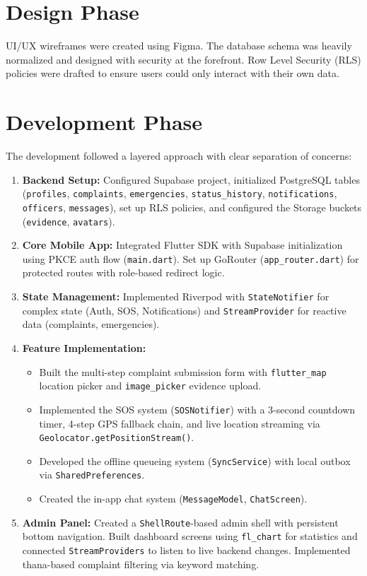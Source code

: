 \documentclass[11pt, a4paper]{report}
\begin{document}
\section{Design Phase}
UI/UX wireframes were created using Figma. The database schema was heavily normalized and designed with security at the forefront. Row Level Security (RLS) policies were drafted to ensure users could only interact with their own data.

\section{Development Phase}
The development followed a layered approach with clear separation of concerns:
\begin{enumerate}
    \item \textbf{Backend Setup:} Configured Supabase project, initialized PostgreSQL tables (\texttt{profiles}, \texttt{complaints}, \texttt{emergencies}, \texttt{status\_history}, \texttt{notifications}, \texttt{officers}, \texttt{messages}), set up RLS policies, and configured the Storage buckets (\texttt{evidence}, \texttt{avatars}).
    \item \textbf{Core Mobile App:} Integrated Flutter SDK with Supabase initialization using PKCE auth flow (\texttt{main.dart}). Set up GoRouter (\texttt{app\_router.dart}) for protected routes with role-based redirect logic.
    \item \textbf{State Management:} Implemented Riverpod with \texttt{StateNotifier} for complex state (Auth, SOS, Notifications) and \texttt{StreamProvider} for reactive data (complaints, emergencies).
    \item \textbf{Feature Implementation:}
    \begin{itemize}
        \item Built the multi-step complaint submission form with \texttt{flutter\_map} location picker and \texttt{image\_picker} evidence upload.
        \item Implemented the SOS system (\texttt{SOSNotifier}) with a 3-second countdown timer, 4-step GPS fallback chain, and live location streaming via \texttt{Geolocator.getPositionStream()}.
        \item Developed the offline queueing system (\texttt{SyncService}) with local outbox via \texttt{SharedPreferences}.
        \item Created the in-app chat system (\texttt{MessageModel}, \texttt{ChatScreen}).
    \end{itemize}
    \item \textbf{Admin Panel:} Created a \texttt{ShellRoute}-based admin shell with persistent bottom navigation. Built dashboard screens using \texttt{fl\_chart} for statistics and connected \texttt{StreamProviders} to listen to live backend changes. Implemented thana-based complaint filtering via keyword matching.
\end{enumerate}
\end{document}
